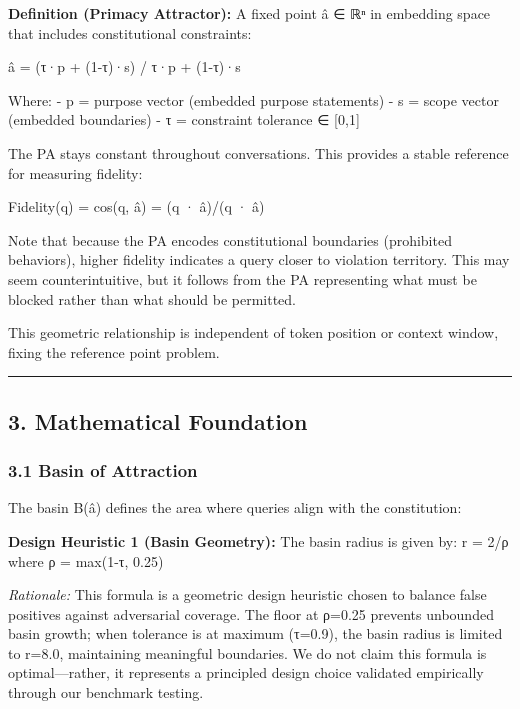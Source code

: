 \textbf{Definition (Primacy Attractor):} A fixed point â ∈ ℝⁿ in
embedding space that includes constitutional constraints:

â = (τ·p + (1-τ)·s) / \textbar\textbar τ·p + (1-τ)·s\textbar\textbar{}

Where: - p = purpose vector (embedded purpose statements) - s = scope
vector (embedded boundaries) - τ = constraint tolerance ∈ {[}0,1{]}

The PA stays constant throughout conversations. This provides a stable
reference for measuring fidelity:

Fidelity(q) = cos(q, â) = (q · â)/(\textbar\textbar q\textbar\textbar{}
· \textbar\textbar â\textbar\textbar)

Note that because the PA encodes constitutional boundaries (prohibited
behaviors), higher fidelity indicates a query closer to violation
territory. This may seem counterintuitive, but it follows from the PA
representing what must be blocked rather than what should be permitted.

This geometric relationship is independent of token position or context
window, fixing the reference point problem.

\begin{center}\rule{0.5\linewidth}{0.5pt}\end{center}

\subsection{3. Mathematical Foundation}\label{mathematical-foundation}

\subsubsection{3.1 Basin of Attraction}\label{basin-of-attraction}

The basin B(â) defines the area where queries align with the
constitution:

\textbf{Design Heuristic 1 (Basin Geometry):} The basin radius is given
by: r = 2/ρ where ρ = max(1-τ, 0.25)

\emph{Rationale:} This formula is a geometric design heuristic chosen to
balance false positives against adversarial coverage. The floor at
ρ=0.25 prevents unbounded basin growth; when tolerance is at maximum
(τ=0.9), the basin radius is limited to r=8.0, maintaining meaningful
boundaries. We do not claim this formula is optimal---rather, it
represents a principled design choice validated empirically through our
benchmark testing.

